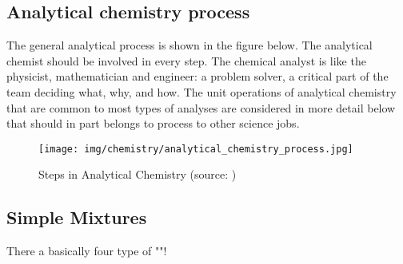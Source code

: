 	\pagebreak
	\subsection{Analytical chemistry process}
	The general analytical process is shown in the figure below. The analytical chemist should be involved in every step. The chemical analyst is like the physicist, mathematician and engineer: a problem solver, a critical part of the team deciding what, why, and how. The unit operations of analytical chemistry that are common to most types of analyses are considered in more detail below that should in part belongs to process to other science jobs.
	\begin{figure}[H]
		\centering
		\texttt{[image: img/chemistry/analytical\_chemistry\_process.jpg]}
		\caption[Steps in Analytical Chemistry]{Steps in Analytical Chemistry (source: \cite{christian2013analytical})}
	\end{figure}	

	\pagebreak
	\subsection{Simple Mixtures}
	There a basically four type of ""!
	
